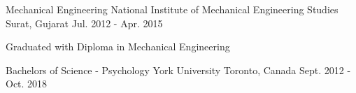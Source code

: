 \begin{cventries}
  \cventry
    {Mechanical Engineering}
    {National Institute of Mechanical Engineering Studies}
    {Surat, Gujarat}
    {Jul. 2012 - Apr. 2015}
    {
      \begin{cvitems}
        \item {Graduated with Diploma in Mechanical Engineering}
      \end{cvitems}
    }
   \cventry
    {Bachelors of Science - Psychology}
    {York University}
    {Toronto, Canada}
    {Sept. 2012 - Oct. 2018}
    { }
\end{cventries}

